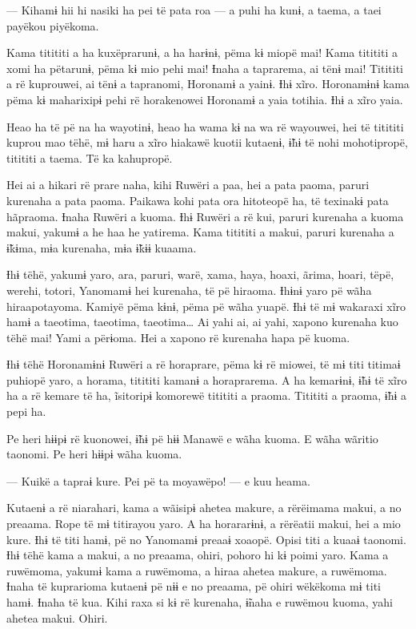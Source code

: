 --- Kihamɨ hii hi nasiki ha pei të pata roa --- a puhi ha kunɨ, a taema, a
taei payëkou piyëkoma. 

Kama titititi a ha kuxëprarunɨ, a ha harɨnɨ, pëma kɨ miopë mai! Kama
 titititi a xomi ha pëtarunɨ, pëma kɨ mio pehi mai! Ɨnaha a taprarema, ai
 tënɨ mai! Titititi a rë kuprouwei, ai tënɨ a tapranomi, Horonamɨ a
 yainɨ. Ɨhɨ xĩro. Horonamɨnɨ kama pëma kɨ maharixipɨ pehi rë horakenowei
 Horonamɨ a yaia totihia. Ɨhɨ a xĩro yaia. 

Heao ha të pë na ha wayotinɨ, heao ha wama kɨ na wa rë wayouwei, hei të
 titititi kuprou mao tëhë, mɨ haru a xĩro hiakawë kuotii kutaenɨ, ɨ̃hɨ të
 nohi mohotipropë, titititi a taema. Të ka kahupropë. 

Hei ai a hikari rë prare naha, kihi Ruwëri a paa, hei a pata paoma,
paruri kurenaha a pata paoma. Paikawa kohi pata ora hitoteopë ha, të
texinakɨ pata hãpraoma. Ɨnaha Ruwëri a kuoma. Ɨhɨ Ruwëri a rë kui,
paruri kurenaha a kuoma makui, yakumɨ a he haa he yatirema. Kama
titititi a makui, paruri kurenaha a ɨ̃kɨma, mɨa kurenaha, mɨa ɨ̃kɨɨ
kuaama. 

Ɨhɨ tëhë, yakumɨ yaro, ara, paruri, warë, xama, haya, hoaxi, ãrima,
hoari, tëpë, werehi, totori, Yanomamɨ hei kurenaha, të pë hiraoma. Ɨhɨnɨ
yaro pë wãha hiraapotayoma. Kamiyë pëma kɨnɨ, pëma pë wãha yuapë. Ɨhɨ të
mɨ wakaraxi xĩro hamɨ a taeotima, taeotima, taeotima… Ai yahi ai,
ai yahi, xapono kurenaha kuo tëhë mai! Yami a përɨoma. Hei a xapono rë
kurenaha hapa pë kuoma. 

Ɨhɨ tëhë Horonamɨnɨ Ruwëri a rë horaprare, pëma kɨ rë miowei, të mɨ titi
 titimaɨ puhiopë yaro, a horama, titititi kamanɨ a horaprarema. A ha
 kemarɨnɨ, ɨ̃hɨ të xĩro ha a rë kemare të ha, ĩsitoripɨ komorewë titititi
 a praoma. Titititi a praoma, ɨ̃hɨ a pepi ha. 

Pe heri hɨɨpɨ rë kuonowei, ɨ̃hɨ pë hɨɨ Manawë e wãha kuoma. E wãha
wãritio taonomi. Pe heri hɨɨpɨ wãha kuoma. 

--- Kuikë a tapraɨ kure. Pei pë ta moyawëpo! --- e kuu heama. 

Kutaenɨ a rë niarahari, kama a wãisipɨ ahetea makure, a rërëimama makui,
 a no preaama. Rope të mɨ titirayou yaro. A ha horararɨnɨ, a rërëatii
 makui, hei a mio kure. Ɨhɨ të titi hamɨ, pë no Yanomamɨ preaaɨ xoaopë.
 Opisi titi a kuaaɨ taonomi. Ɨhɨ tëhë kama a makui, a no preaama, ohiri,
 pohoro hi kɨ poimi yaro. Kama a ruwëmoma, yakumɨ kama a ruwëmoma, a
 hiraa ahetea makure, a ruwëmoma. Ɨnaha të kuprarioma kutaenɨ pë nɨɨ e no
 preaama, pë ohiri wëkëkoma mɨ titi hamɨ. Ɨnaha të kua. Kihi raxa si kɨ
 rë kurenaha, ɨ̃naha e ruwëmou kuoma, yahi ahetea makui. Ohiri. 

